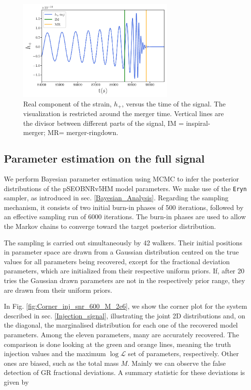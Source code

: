 \begin{figure}[h!]
    \centering
    \includegraphics[width=0.7\textwidth]{Images/Injection_division.pdf}
    \caption{Real component of the strain, $h_+$, versus the time of the signal. The visualization is restricted around the merger time. Vertical lines are the divisor between different parts of the signal, IM = inspiral-merger; MR= merger-ringdown.}
    \label{fig:Injection_division}
\end{figure}


\subsection{Parameter estimation on the full signal}

We perform Bayesian parameter estimation using MCMC to infer the posterior distributions of the pSEOBNRv5HM model parameters. We make use of the \texttt{Eryn} sampler, as introduced in sec. \ref{Bayesian_Analysis}. Regarding the sampling mechanism, it consists of two initial burn-in phases of 500 iterations, followed by an effective sampling run of 6000 iterations.
The burn-in phases are used to allow the Markov chains to converge toward the target posterior distribution.

The sampling is carried out simultaneously by 42 walkers. Their initial positions in parameter space are drawn from a Gaussian distribution centred on the true values for all parameters being recovered, except for the fractional deviation parameters, which are initialized from their respective uniform priors. If, after 20 tries the Gaussian drawn parameters are not in the respectively prior range, they are drawn from their uniform priors.

In Fig. \ref{fig:Corner_inj_snr_600_M_2e6}, we show the corner plot for the system described in sec. \ref{Injection_signal}, illustrating the joint 2D distributions and, on the diagonal, the marginalised distribution for each one of the recovered model parameters. Among the eleven parameters, many are accurately recovered. The comparison is done looking at the green and orange lines, meaning the truth injection values and the maximum $ \log \mathcal{L}$ set of parameters, respectively. Other ones are biased, such as the total mass $M$. Mainly we can observe the false detection of GR fractional deviations. A summary statistic for these deviations is given by

